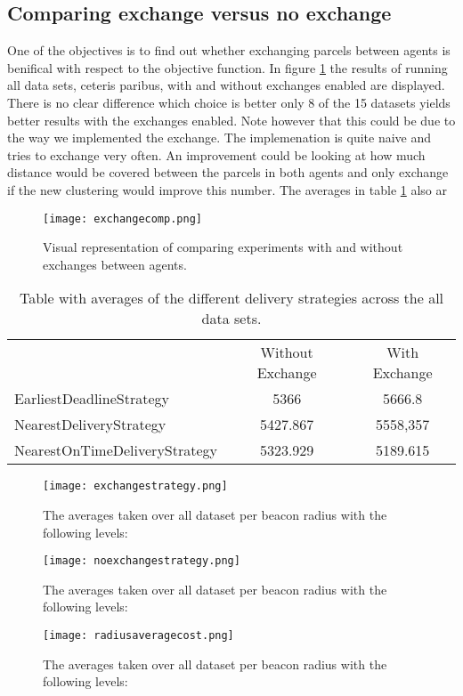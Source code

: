 \documentclass[../main.tex]{subfiles}
\begin{document}
\subsection{Comparing exchange versus no exchange}
One of the objectives is to find out whether exchanging parcels between agents is benifical with respect to the objective function.
In figure \ref{fig:exch} the results of running all data sets, ceteris paribus, with and without exchanges enabled are displayed.
There is no clear difference which choice is better only 8 of the 15 datasets yields better results with the exchanges enabled.
Note however that this could be due to the way we implemented the exchange. 
The implemenation is quite naive and tries to exchange very often. 
An improvement could be looking at how much distance would be covered between the parcels in both agents and only exchange if the new clustering would improve this number.
The averages in table \ref{tab:avgstrat} also ar
\begin{figure}
	\centering
	\texttt{[image: exchangecomp.png]}
	\caption{Visual representation of comparing experiments with and without exchanges between agents.}
	\label{fig:exch}
\end{figure}

\begin{table}
\begin{tabular}{lcc}
	& Without Exchange & With Exchange \\ 
	EarliestDeadlineStrategy & 5366 & 5666.8 \\ 
	NearestDeliveryStrategy & 5427.867 & 5558,357 \\ 
	NearestOnTimeDeliveryStrategy & 5323.929 & 5189.615 \\ 
\end{tabular}

\caption{Table with averages of the different delivery strategies across the all data sets.}
\label{tab:avgstrat}
\end{table}

\begin{figure}
	\centering
	\texttt{[image: exchangestrategy.png]}
	\caption{The averages taken over all dataset per beacon radius with the following levels:}
	\label{fig:strat_ex}
\end{figure}

\begin{figure}
	\centering
	\texttt{[image: noexchangestrategy.png]}
	\caption{The averages taken over all dataset per beacon radius with the following levels:}
	\label{fig:strat_noex}
\end{figure}

\begin{figure}
	\centering
	\texttt{[image: radiusaveragecost.png]}
	\caption{The averages taken over all dataset per beacon radius with the following levels:}
	\label{fig:rad}
\end{figure}
\end{document}
